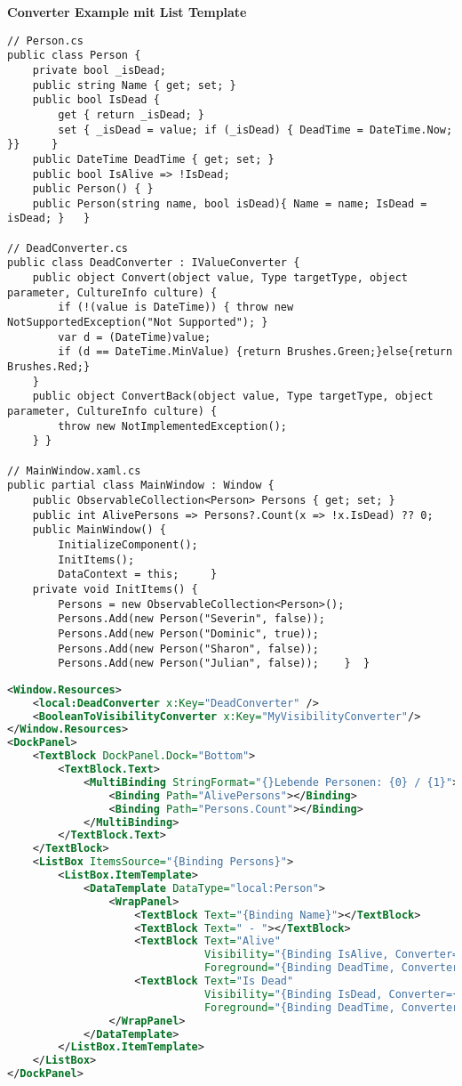 \textbf{Converter Example mit List Template}
\begin{lstlisting}
// Person.cs
public class Person {
    private bool _isDead;
    public string Name { get; set; }
    public bool IsDead {
        get { return _isDead; }
        set { _isDead = value; if (_isDead) { DeadTime = DateTime.Now; }}     }
    public DateTime DeadTime { get; set; }
    public bool IsAlive => !IsDead;
    public Person() { }
    public Person(string name, bool isDead){ Name = name; IsDead = isDead; }   }

// DeadConverter.cs
public class DeadConverter : IValueConverter {
    public object Convert(object value, Type targetType, object parameter, CultureInfo culture) {
        if (!(value is DateTime)) { throw new NotSupportedException("Not Supported"); }
        var d = (DateTime)value;
        if (d == DateTime.MinValue) {return Brushes.Green;}else{return Brushes.Red;}
    }
    public object ConvertBack(object value, Type targetType, object parameter, CultureInfo culture) {
        throw new NotImplementedException();
    } }

// MainWindow.xaml.cs
public partial class MainWindow : Window {
    public ObservableCollection<Person> Persons { get; set; }
    public int AlivePersons => Persons?.Count(x => !x.IsDead) ?? 0;
    public MainWindow() {
        InitializeComponent();
        InitItems();
        DataContext = this;     }
    private void InitItems() {
        Persons = new ObservableCollection<Person>();
        Persons.Add(new Person("Severin", false));
        Persons.Add(new Person("Dominic", true));
        Persons.Add(new Person("Sharon", false));
        Persons.Add(new Person("Julian", false));    }  }
\end{lstlisting}
\begin{lstlisting}[language=xml]
<Window.Resources>
    <local:DeadConverter x:Key="DeadConverter" />
    <BooleanToVisibilityConverter x:Key="MyVisibilityConverter"/>
</Window.Resources>
<DockPanel>
    <TextBlock DockPanel.Dock="Bottom">
        <TextBlock.Text>
            <MultiBinding StringFormat="{}Lebende Personen: {0} / {1}">
                <Binding Path="AlivePersons"></Binding>
                <Binding Path="Persons.Count"></Binding>
            </MultiBinding>
        </TextBlock.Text>
    </TextBlock>
    <ListBox ItemsSource="{Binding Persons}">
        <ListBox.ItemTemplate>
            <DataTemplate DataType="local:Person">
                <WrapPanel>
                    <TextBlock Text="{Binding Name}"></TextBlock>
                    <TextBlock Text=" - "></TextBlock>
                    <TextBlock Text="Alive"
                               Visibility="{Binding IsAlive, Converter={StaticResource MyVisibilityConverter}}"
                               Foreground="{Binding DeadTime, Converter={StaticResource DeadConverter}}"></TextBlock>
                    <TextBlock Text="Is Dead"
                               Visibility="{Binding IsDead, Converter={StaticResource MyVisibilityConverter}}"
                               Foreground="{Binding DeadTime, Converter={StaticResource DeadConverter}}"></TextBlock>
                </WrapPanel>
            </DataTemplate>
        </ListBox.ItemTemplate>
    </ListBox>
</DockPanel>
\end{lstlisting}
